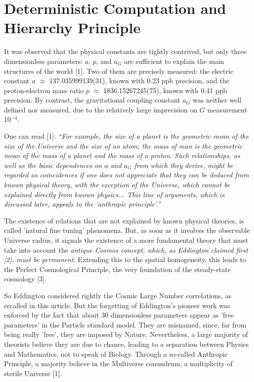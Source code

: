 \documentclass[twoside,draft]{article}
\begin{document}
\begin{sloppypar}
{\section{Deterministic Computation and Hierarchy Principle}
It was observed that the physical constants are tightly contrived, but only three dimensionless parameters: $a$, $p$, and $a_{G}$ are sufficient to explain the main structures of the world [1]. Two of them are precisely measured: the electric constant $a$ $\approx$ 137.035999139(31), known with 0.23 ppb precision, and the proton-electron mass ratio $p$ $\approx$ 1836.15267245(75), known with 0.41 ppb precision. By contrast, the gravitational coupling constant $a_{G}$ was neither well defined nor measured, due to the relatively large imprecision on $G$ measurement 10$^{-4}\!$.

One can read [1]: \textit{“For example, the size of a planet is the geometric mean of the size of the Universe and the size of an atom; the mass of man is the geometric mean of the mass of a planet and the mass of a proton. Such relationships, as well as the basic dependences on $a$ and $a_G$ from which they derive, might be regarded as coincidences if one does not appreciate that they can be deduced from known physical theory, with the exception of the Universe, which cannot be explained directly from kwown physics... This line of arguments, which is discussed later, appeals to the 'anthropic principle'.”}

The existence of relations that are not explained by known physical theories, is called 'natural fine tuning' phenomena. But, as soon as it involves the observable Universe radius, it signals the existence of a more fundamental theory that must take into account the \textit{antique Cosmos concept, which, as Eddington claimed first [2], must be permanent}. Extending this to the spatial homogeneity, this leads to the Perfect Cosmological Principle, the very foundation of the steady-state cosmology [3].

So Eddington considered rightly the Cosmic Large Number correlations, as recalled in this article. But the forgetting of Eddington's pioneer work was enforced by the fact that about 30 dimensionless parameters appear as 'free parameters' in the Particle standard model. They are misnamed, since, far from being really 'free', they are imposed by Nature. Nevertheless, a large majority of theorists believe they are due to chance, leading to a separation between Physics and Mathematics, not to speak of Biology. Through a so-called Anthropic Principle, a majority believe in the Multiverse conundrum, a multiplicity of sterile Universe [1].

}
\end{sloppypar}
\end{document}
